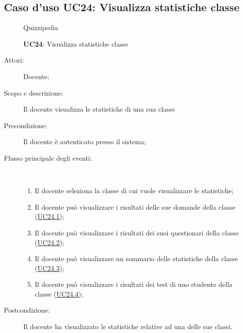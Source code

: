 \subsection{Caso d'uso UC24: Visualizza statistiche classe}
\begin{figure}[H]
	\centering
	\begin{resizedtikzpicture}{\textwidth}
		\begin{umlsystem}[x=0, fill=lightgray!20]{Quizzipedia}
		\end{umlsystem}
	\end{resizedtikzpicture}
	\caption{\textbf{UC24}: Visualizza statistiche classe}
	\label{UC24}
\end{figure}
\begin{description}
	\item[Attori:] Docente;
	\item[Scopo e descrizione:] Il docente visualizza le statistiche di una sua classe
	\item[Precondizione:] Il docente è autenticato presso il sistema;
	
	\item[Flusso principale degli eventi:] \ 
	\begin{enumerate}
		\item Il docente seleziona la classe di cui vuole visualizzare le statistiche;
		\item Il docente può visualizzare i risultati delle sue domande della classe (\hyperlink{UC24.1}{UC24.1});
		\item Il docente può visualizzare i risultati dei suoi questionari della classe (\hyperlink{UC24.2}{UC24.2});
		\item Il docente può visualizzare un sommario delle statistiche della classe (\hyperlink{UC24.3}{UC24.3});
		\item Il docente può visualizzare i risultati dei test di uno studente della classe (\hyperlink{UC24.4}{UC24.4});
		
	\end{enumerate}
	\item[Postcondizione:] Il docente ha visualizzato le statistiche relative ad una delle sue classi.
\end{description}
\hypertarget{UC24.1}{}

